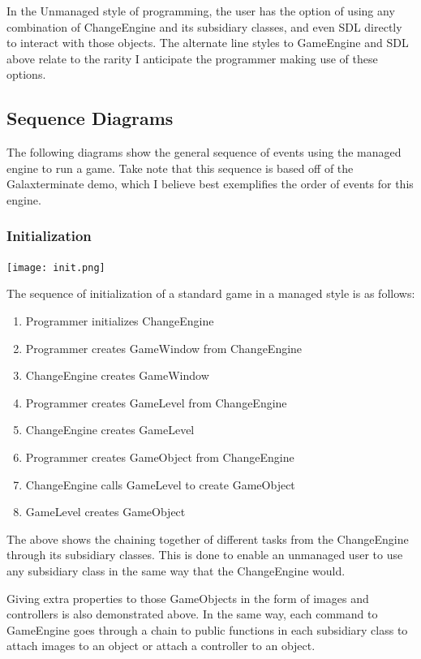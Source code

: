 \documentclass[12pt]{article}
\begin{document}
In the Unmanaged style of programming, the user has the option of using any combination of ChangeEngine and its subsidiary classes, and even SDL directly to interact with those objects. The alternate line styles to GameEngine and SDL above relate to the rarity I anticipate the programmer making use of these options.

\subsection{Sequence Diagrams}
The following diagrams show the general sequence of events using the managed engine to run a game. Take note that this sequence is based off of the Galaxterminate demo, which I believe best exemplifies the order of events for this engine.

\subsubsection{Initialization}
\texttt{[image: init.png]}

The sequence of initialization of a standard game in a managed style is as follows:

\begin{enumerate}
 \item Programmer initializes ChangeEngine
 \item Programmer creates GameWindow from ChangeEngine
 \item ChangeEngine creates GameWindow
 \item Programmer creates GameLevel from ChangeEngine
 \item ChangeEngine creates GameLevel
 \item Programmer creates GameObject from ChangeEngine
 \item ChangeEngine calls GameLevel to create GameObject
 \item GameLevel creates GameObject
\end{enumerate}

The above shows the chaining together of different tasks from the ChangeEngine through its subsidiary classes. This is done to enable an unmanaged user to use any subsidiary class in the same way that the ChangeEngine would.

Giving extra properties to those GameObjects in the form of images and controllers is also demonstrated above. In the same way, each command to GameEngine goes through a chain to public functions in each subsidiary class to attach images to an object or attach a controller to an object.
\end{document}
